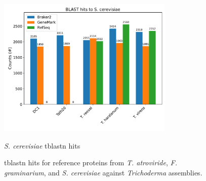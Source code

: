 \begin{figure}[htp]
  \centering
  \ContinuedFloat
  \includegraphics[width=0.75\textwidth]{figures/blast-scerevisiae.pdf}
  \caption{\textit{S. cerevisiae} tblastn hits}
  \label{fig:blast-scerevisiae}
  \caption{tblastn hits for reference proteins from \textit{T. atroviride}, \textit{F. graminarium}, and \textit{S. cerevisiae} against \textit{Trichoderma} assemblies.}
  \label{fig:blast-hits}
\end{figure}

